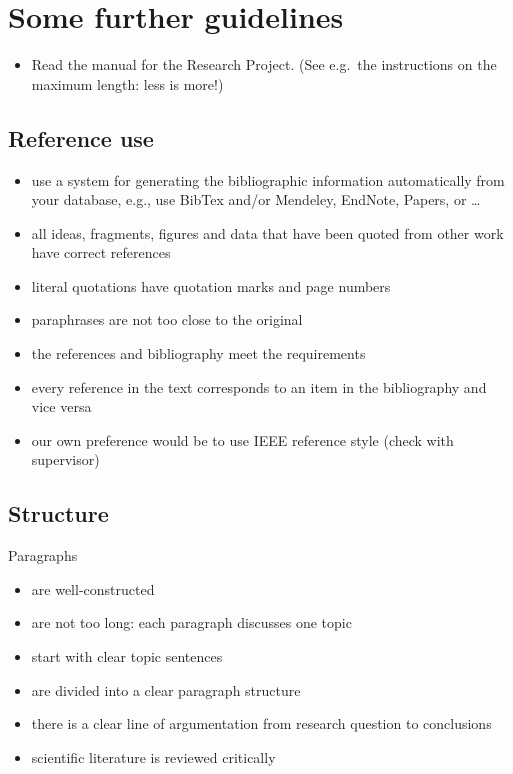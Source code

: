 \appendix
\section{Some further guidelines}

\begin{itemize}
\item Read the manual for the Research Project. (See e.g.\ the instructions on the maximum length: less is more!)
\end{itemize}

\subsection{Reference use}
\begin{itemize}
\item use a system for generating the bibliographic information automatically from your database, e.g., use BibTex and/or Mendeley, EndNote, Papers, or \ldots
\item all ideas, fragments, figures and data that have been quoted from other work have correct references
\item literal quotations have quotation marks and page numbers
\item paraphrases are not too close to the original
\item the references and bibliography meet the requirements
\item every reference in the text corresponds to an item in the bibliography and vice versa
\item our own preference would be to use IEEE reference style (check with supervisor)
\end{itemize}

\subsection{Structure}
Paragraphs
\begin{itemize}
\item are well-constructed
\item are not too long: each paragraph discusses one topic
\item start with clear topic sentences
\item are divided into a clear paragraph structure
\item there is a clear line of argumentation from research question to conclusions
\item scientific literature is reviewed critically
\end{itemize}

